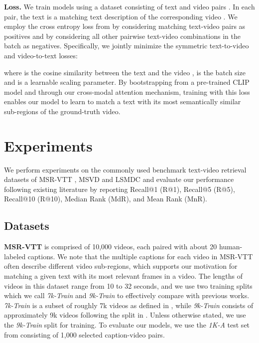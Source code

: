 \documentclass[10pt,twocolumn,letterpaper]{article}
\begin{document}
\textbf{Loss.}
We train models using a dataset  consisting of  text and video pairs . In each pair, the text  is a matching text description of the corresponding video . We employ the cross entropy loss from \cite{zhai2018classification} by considering matching text-video pairs as positives and by considering all other pairwise text-video combinations in the batch as negatives. Specifically, we jointly minimize the symmetric text-to-video and video-to-text losses:



where  is the cosine similarity between the text  and the video ,  is the batch size and  is a learnable scaling parameter. By bootstrapping from a pre-trained CLIP model and through our cross-modal attention mechanism, training with this loss enables our model to learn to match a text with its most semantically similar sub-regions of the ground-truth video. 


\section{Experiments}
We perform experiments on the commonly used benchmark text-video retrieval datasets of MSR-VTT \cite{xu2016msr}, MSVD \cite{chen2011collecting} and LSMDC \cite{rohrbach2017movie} and evaluate our performance following existing literature \cite{yu2018joint, miech2018learning, liu2019use,  gabeur2020multi, bain2021frozen} by reporting Recall@1 (R@1), Recall@5 (R@5), Recall@10 (R@10), Median Rank (MdR), and Mean Rank (MnR).

\subsection{Datasets}
\textbf{MSR-VTT} is comprised of 10,000 videos, each paired with about 20 human-labeled captions. We note that the multiple captions for each video in MSR-VTT often describe different video sub-regions, which supports our motivation for matching a given text with its most relevant frames in a video. The lengths of videos in this dataset range from 10 to 32 seconds, and we use two training splits which we call \textit{7k-Train} and \textit{9k-Train} to effectively compare with previous works. \textit{7k-Train} is a subset of roughly 7k videos as defined in \cite{miech2019howto100m}, while \textit{9k-Train} consists of approximately 9k videos following the split in \cite{gabeur2020multi}. Unless otherwise stated, we use the \textit{9k-Train} split for training. To evaluate our models, we use the \textit{1K-A} test set from \cite{yu2018joint} consisting of 1,000 selected caption-video pairs. 
\end{document}
